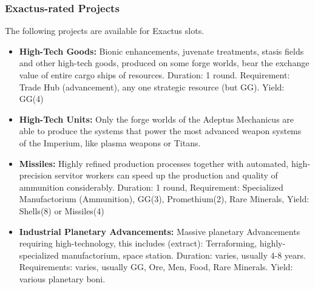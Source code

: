 \subsubsection{Exactus-rated Projects} 
The following projects are available for Exactus slots. 
\begin{itemize} 
    \item \textbf{High-Tech Goods:} Bionic enhancements, juvenate treatments, stasis fields and other high-tech goods, produced on some forge worlds, bear the exchange value of entire cargo ships of resources. Duration: 1 round. Requirement: Trade Hub (advancement), any one strategic resource (but GG). Yield: GG(4)  
    \item \textbf{High-Tech Units:} Only the forge worlds of the Adeptus Mechanicus are able to produce the systems that power the most advanced weapon systems of the Imperium, like plasma weapons or Titans.
    \item \textbf{Missiles:} Highly refined production processes together with automated, high-precision servitor workers can speed up the production and quality of ammunition considerably.  Duration: 1 round, Requirement: Specialized Manufactorium (Ammunition), GG(3), Promethium(2), Rare Minerals, Yield: Shells(8) or Missiles(4)
    \item \textbf{Industrial Planetary Advancements:} Massive planetary Advancements requiring high-technology, this includes (extract): Terraforming, highly-specialized manufactorium, space station. Duration: varies, usually 4-8 years. Requirements: varies, usually GG, Ore, Men, Food, Rare Minerals. Yield: various planetary boni.
\end{itemize} 
